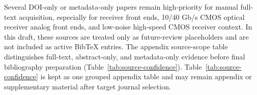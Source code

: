 Several DOI-only or metadata-only papers remain high-priority for manual full-text acquisition, especially for receiver front ends, 10/40 Gb/s CMOS optical receiver analog front ends, and low-noise high-speed CMOS receiver context. In this draft, these sources are treated only as future-review placeholders and are not included as active BibTeX entries. The appendix source-scope table distinguishes full-text, abstract-only, and metadata-only evidence before final bibliography preparation (Table~\ref{tab:source-confidence}). Table~\ref{tab:source-confidence} is kept as one grouped appendix table and may remain appendix or supplementary material after target journal selection.
